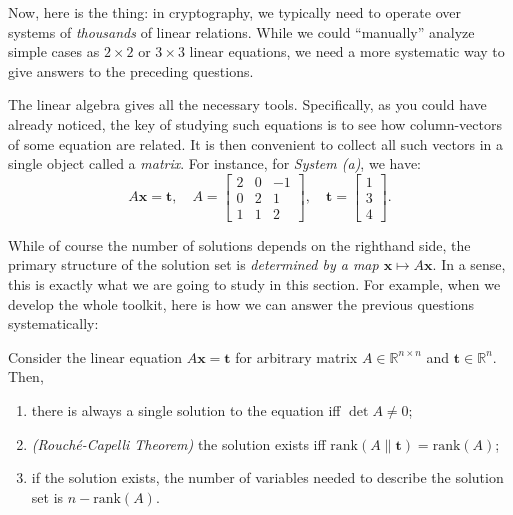 \documentclass[../../book.tex]{subfiles}
\begin{document}
Now, here is the thing: in cryptography, we typically need to operate over systems of \textit{thousands} of linear relations.
While we could ``manually'' analyze simple cases as $2 \times 2$ or $3 \times 3$ linear equations, we need a more systematic way to give answers to the preceding questions.

The linear algebra gives all the necessary tools. 
Specifically, as you could have already noticed, the key of studying such equations is to see how column-vectors of some equation are related.
It is then convenient to collect all such vectors in a single object called a \textit{matrix}.
For instance, for \textit{System (a)}, we have:
\begin{equation*}
    A\mathbf{x} = \mathbf{t}, \quad A = \begin{bmatrix}
        2 & 0 & -1 \\
        0 & 2 & 1 \\
        1 & 1 & 2
    \end{bmatrix}, \quad \mathbf{t} = \begin{bmatrix}
        1 \\ 3 \\ 4
    \end{bmatrix}.
\end{equation*}

While of course the number of solutions depends on the righthand side, the primary structure of the solution set is \emph{determined by a map $\mathbf{x} \mapsto A\mathbf{x}$}.
In a sense, this is exactly what we are going to study in this section.
For example, when we develop the whole toolkit, here is how we can answer the previous questions systematically:

\begin{proposition}\label{prop:basic-facts}
    Consider the linear equation $A\mathbf{x}=\mathbf{t}$ for arbitrary matrix $A \in \mathbb{R}^{n \times n}$ and $\mathbf{t} \in \mathbb{R}^n$. Then,
    \begin{enumerate}
    \item there is always a single solution to the equation iff $\det A \neq 0$;
    \item \textit{(Rouché-Capelli Theorem)} the solution exists iff $\text{rank}(A \| \mathbf{t})=\text{rank}(A)$;
    \item if the solution exists, the number of variables needed to describe the solution set is $n-\text{rank}(A)$.
    \end{enumerate}
\end{proposition}
\end{document}
